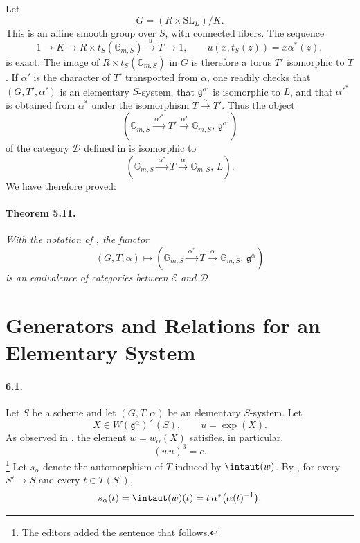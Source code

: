 Let
\[
 G=(R\times\mathrm{SL}_L)/K.
\]
This is an affine smooth group over \(S\), with connected fibers.
The sequence
\[
 1\longrightarrow K\longrightarrow
 R\times t_S(\mathbb G_{m,S})
 \xrightarrow{\ u\ }T\longrightarrow1,
 \qquad
 u(x,t_S(z))=x\alpha^\ast(z),
\]
is exact.  The image of \(R\times t_S(\mathbb G_{m,S})\) in \(G\)
is therefore a torus \(T'\) isomorphic to \(T\).  If \(\alpha'\) is
the character of \(T'\) transported from \(\alpha\), one readily
checks that \((G,T',\alpha')\) is an elementary \(S\)-system, that
\(\mathfrak g^{\alpha'}\) is isomorphic to \(L\), and that
\(\alpha'^\ast\) is obtained from \(\alpha^\ast\) under the
isomorphism \(T\xrightarrow{\sim}T'\).  Thus the object
\[
 \left(
 \mathbb G_{m,S}\xrightarrow{\ \alpha'^\ast\ }T'
 \xrightarrow{\ \alpha'\ }\mathbb G_{m,S},\,
 \mathfrak g^{\alpha'}
 \right)
\]
of the category \(\mathcal D\) defined in  is isomorphic to
\[
 \left(
 \mathbb G_{m,S}\xrightarrow{\ \alpha^\ast\ }T
 \xrightarrow{\ \alpha\ }\mathbb G_{m,S},\,L
 \right).
 \]
We have therefore proved:

\paragraph{\textbf{Theorem 5.11.}}
\emph{With the notation of , the functor}
\[
 (G,T,\alpha)\longmapsto
 \left(
 \mathbb G_{m,S}\xrightarrow{\ \alpha^\ast\ }T
 \xrightarrow{\ \alpha\ }\mathbb G_{m,S},\,
 \mathfrak g^\alpha
 \right)
\]
\emph{is an equivalence of categories between
\(\mathcal E\) and \(\mathcal D\).}



\section{Generators and Relations for an Elementary System}

\paragraph{\textbf{6.1.}}
Let \(S\) be a scheme and let \((G,T,\alpha)\) be an elementary
\(S\)-system.  Let
\[
 X\in W(\mathfrak g^\alpha)^\times(S),
 \qquad u=\exp(X).
\]
As observed in , the element \(w=w_\alpha(X)\) satisfies, in
particular,
\[
 (wu)^3=e.
\]
\footnote{The editors added the sentence that follows.}
Let \(s_\alpha\) denote the automorphism of \(T\) induced by
\(\intaut(w)\).  By \textup{}, for every \(S'\to S\)
and every \(t\in T(S')\),
\[
 s_\alpha(t)=\intaut(w)(t)
 =t\,\alpha^\ast\bigl(\alpha(t)^{-1}\bigr).
\]


